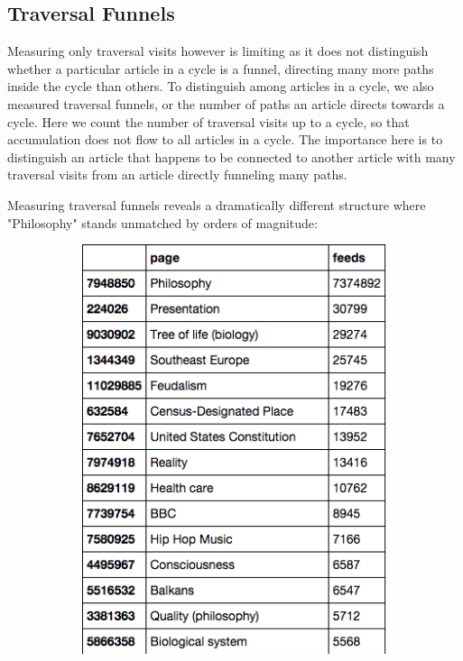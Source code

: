 \documentclass[twoside]{article}
\begin{document}
\subsection{Traversal Funnels}

Measuring only traversal visits however is limiting as it does not distinguish whether a particular article in a cycle 
is a funnel, directing many more paths inside the cycle than others. 
To distinguish among articles in a cycle, we also measured traversal funnels, or the number of 
paths an article directs towards a cycle. Here we count the number of traversal visits up to a cycle, 
so that accumulation does not flow to all articles in a cycle.
The importance here is to distinguish an article that happens to be connected to another article with many traversal visits 
from an article directly funneling many paths.

Measuring traversal funnels reveals a dramatically different structure where "Philosophy" stands unmatched by orders of magnitude:

\begin{figure}[H]
\centering
    \caption{Top Funnels}
    \begin{subfigure}[b]{0.5\textwidth}
        \includegraphics[width=\textwidth]{graphics/top_funnels.png}
    \end{subfigure}
\end{figure}
\end{document}
